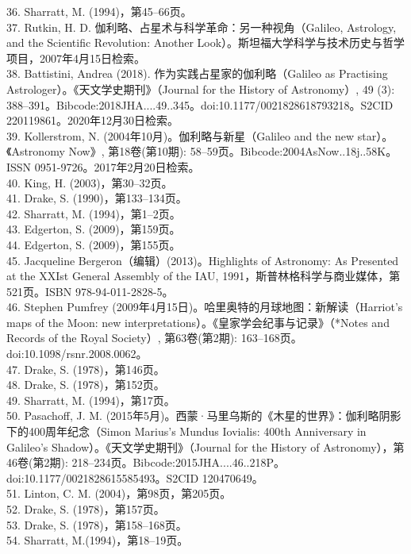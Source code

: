 36. Sharratt, M. (1994)，第45–66页。\\
37. Rutkin, H. D. 伽利略、占星术与科学革命：另一种视角（Galileo, Astrology, and the Scientific Revolution: Another Look）。斯坦福大学科学与技术历史与哲学项目，2007年4月15日检索。\\
38. Battistini, Andrea (2018). 作为实践占星家的伽利略（Galileo as Practising Astrologer）。《天文学史期刊》（Journal for the History of Astronomy）, 49 (3): 388–391。Bibcode:2018JHA....49..345。doi:10.1177/0021828618793218。S2CID 220119861。2020年12月30日检索。\\
39. Kollerstrom, N. (2004年10月)。伽利略与新星（Galileo and the new star）。《Astronomy Now》, 第18卷(第10期): 58–59页。Bibcode:2004AsNow..18j..58K。ISSN 0951-9726。2017年2月20日检索。\\
40. King, H. (2003)，第30–32页。\\
41. Drake, S. (1990)，第133–134页。\\
42. Sharratt, M. (1994)，第1–2页。\\
43. Edgerton, S. (2009)，第159页。\\
44. Edgerton, S. (2009)，第155页。\\
45. Jacqueline Bergeron（编辑）(2013)。Highlights of Astronomy: As Presented at the XXIst General Assembly of the IAU, 1991，斯普林格科学与商业媒体，第521页。ISBN 978-94-011-2828-5。\\
46. Stephen Pumfrey (2009年4月15日)。哈里奥特的月球地图：新解读（Harriot's maps of the Moon: new interpretations）。《皇家学会纪事与记录》（*Notes and Records of the Royal Society）, 第63卷(第2期): 163–168页。doi:10.1098/rsnr.2008.0062。\\
47. Drake, S. (1978)，第146页。\\
48. Drake, S. (1978)，第152页。\\
49. Sharratt, M. (1994)，第17页。\\
50. Pasachoff, J. M. (2015年5月)。西蒙·马里乌斯的《木星的世界》：伽利略阴影下的400周年纪念（Simon Marius's Mundus Iovialis: 400th Anniversary in Galileo's Shadow）。《天文学史期刊》（Journal for the History of Astronomy），第46卷(第2期): 218–234页。Bibcode:2015JHA....46..218P。doi:10.1177/0021828615585493。S2CID 120470649。\\
51. Linton, C. M. (2004)，第98页，第205页。\\
52. Drake, S. (1978)，第157页。\\
53. Drake, S. (1978)，第158–168页。\\
54. Sharratt, M.(1994)，第18–19页。\\
